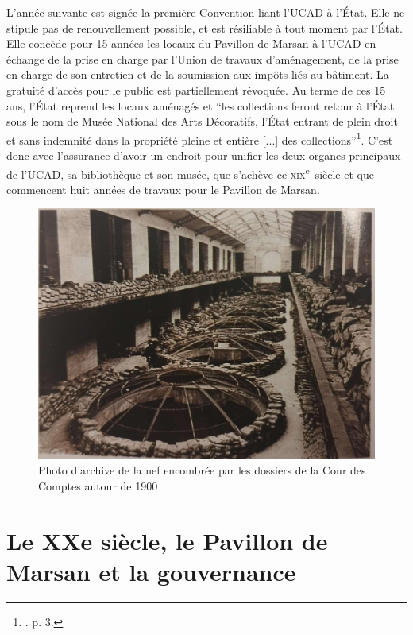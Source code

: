 L'année suivante est signée la première Convention liant l'UCAD à l'État. Elle ne stipule pas de renouvellement possible, et est résiliable à tout moment par l'État. Elle concède pour 15 années les locaux du Pavillon de Marsan à l'UCAD en échange de la prise en charge par l'Union de travaux d'aménagement, de la prise en charge de son entretien et de la soumission aux impôts liés au bâtiment. La gratuité d'accès pour le public est partiellement révoquée. Au terme de ces 15 ans, l'État reprend les locaux aménagés et \enquote{les collections feront retour à l'État sous le nom de Musée National des Arts Décoratifs, l'État entrant de plein droit et sans indemnité dans la propriété pleine et entière [...] des collections}\footnote{\cite{noauthor__1970}. p. 3.}. C'est donc avec l'assurance d'avoir un endroit pour unifier les deux organes principaux de l'UCAD, sa bibliothèque et son musée, que s'achève ce \textsc{xix}\textsuperscript{e}~siècle et que commencent huit années de travaux pour le Pavillon de Marsan.

\begin{figure}
    \centering
    \includegraphics[width=0.75\linewidth]{Illustrations/1.jpg}
    \caption{Photo d'archive de la nef encombrée par les dossiers de la Cour des Comptes autour de 1900}
    \label{fig:placeholder}
\end{figure}


\chapter{Le XXe siècle, le Pavillon de Marsan et la gouvernance}

